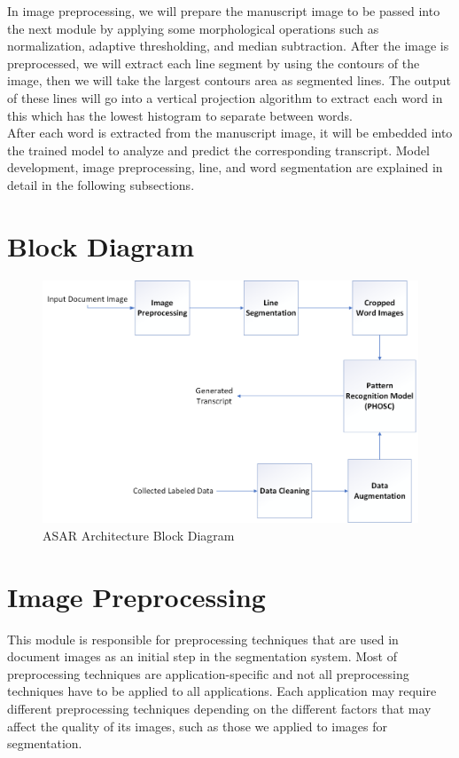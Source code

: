 \noindent
In image preprocessing, we will prepare the manuscript image to be passed into the next module by applying some morphological operations such as normalization, adaptive thresholding, and median subtraction. After the image is preprocessed, we will extract each line segment by using the contours of the image, then we will take the largest contours area as segmented lines. The output of these lines will go into a vertical projection algorithm to extract each word in this which has the lowest histogram to separate between words. \\

\noindent
After each word is extracted from the manuscript image, it will be embedded into the trained model to analyze and predict the corresponding transcript. Model development, image preprocessing, line, and word segmentation are explained in detail in the following subsections.

\newpage
\section{Block Diagram}

\begin{figure}[!htb]
    \centering
    \includegraphics[width=14cm]{images/block diagram.png}
    \caption{ASAR Architecture Block Diagram}
    \label{fig:block-digram}
\end{figure}

\section{Image Preprocessing}
This module is responsible for preprocessing techniques that are used in document images as an initial step in the segmentation system. Most of preprocessing techniques are application-specific and not all preprocessing techniques have to be applied to all applications. Each application may require different preprocessing techniques depending on the different factors that may affect the quality of its images, such as those we applied to images for segmentation.

